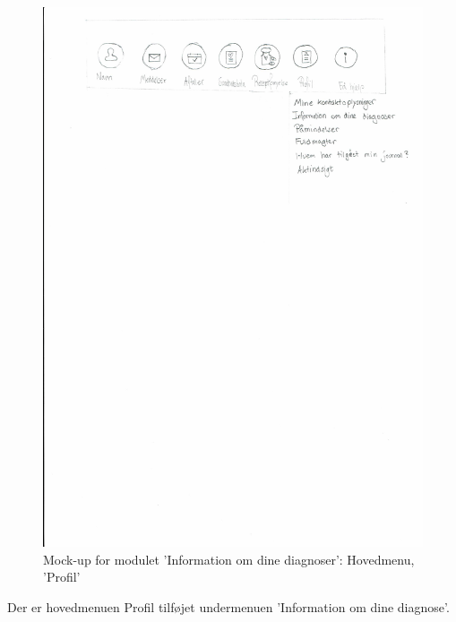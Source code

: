 \begin{figure}[H]
	\centering
	\includegraphics[angle=0, width=\linewidth]{Materials/Information_Hovedmenu.pdf}
	\caption{Mock-up for modulet 'Information om dine diagnoser': Hovedmenu, 'Profil'}
	\label{fig:Mock-Up5}
\end{figure}
Der er hovedmenuen Profil tilføjet undermenuen 'Information om dine diagnose'.
